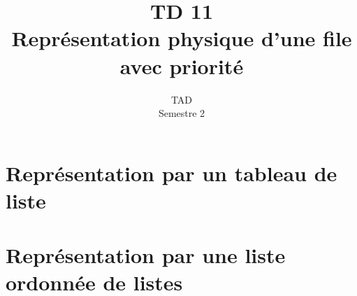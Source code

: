 \documentclass{article}
\title{TD 11\\ Représentation physique d'une file avec priorité}
\date{TAD\\ Semestre 2}
\begin{document}
	\maketitle
	\section{Représentation par un tableau de liste}
		\subsection{}
			
		\subsection{}
			
		\subsection{}
			
	\section{Représentation par une liste ordonnée de listes}
		\subsection{}
		
		\subsection{}
			
		\subsection{}
			
		
\end{document}
